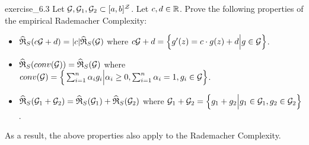 \begin{exercise}{}{exercise_6.3}
    Let $\mathcal{G}, \mathcal{G}_1, \mathcal{G}_2 \subset [a,b]^{\mathcal{Z}}$. Let $c, d \in \mathbb{R}$. Prove the following properties of the empirical Rademacher Complexity:
    \begin{itemize}
        \item $\widehat{\mathfrak{R}}_S(c\mathcal{G} + d) = |c|\widehat{\mathfrak{R}}_S(\mathcal{G})$ where $c\mathcal{G}+d=\Big\{ g'(z) = c\cdot g(z) + d \Big| g\in\mathcal{G} \Big\}$.
        \item $\widehat{\mathfrak{R}}_S(conv(\mathcal{G}))=\widehat{\mathfrak{R}}_S(\mathcal{G})$ where $conv(\mathcal{G})=\Big\{ \sum_{i=1}^n \alpha_ig_i\Big|\alpha_i\ge0, \sum_{i=1}^n\alpha_i=1, g_i\in\mathcal{G} \Big\}$.
        \item $\widehat{\mathfrak{R}}_S(\mathcal{G}_1 + \mathcal{G}_2)=\widehat{\mathfrak{R}}_S(\mathcal{G}_1) + \widehat{\mathfrak{R}}_S(\mathcal{G}_2)$ where $\mathcal{G}_1 + \mathcal{G}_2 = \Big\{ g_1 + g_2 \Big| g_1\in\mathcal{G}_1, g_2\in\mathcal{G}_2 \Big\}$.
    \end{itemize}

    \noindent As a result, the above properties also apply to the Rademacher Complexity.
\end{exercise}

